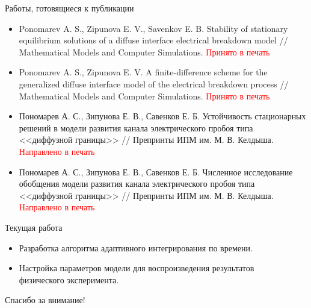\documentclass[aspectratio=169]{beamer}
\begin{document}
\begin{frame}{Работы, готовящиеся к публикации}
\begin{itemize}
	\item Ponomarev A. S., Zipunova E. V., Savenkov E. B. Stability of stationary equilibrium solutions of a diffuse interface electrical breakdown model // Mathematical Models and Computer Simulations. \textcolor{red}{Принято в печать}
	\item Ponomarev A. S., Zipunova E. V. A finite-difference scheme for the generalized diffuse interface model of the electrical breakdown process // Mathematical Models and Computer Simulations. \textcolor{red}{Принято в печать}
	\item Пономарев А. С., Зипунова Е. В., Савенков Е. Б. Устойчивость стационарных решений в модели развития канала электрического пробоя типа <<диффузной границы>> // Препринты ИПМ им. М. В. Келдыша. \textcolor{red}{Направлено в печать}
	\item Пономарев А. С., Зипунова Е. В., Савенков Е. Б. Численное исследование обобщения модели развития канала электрического пробоя типа <<диффузной границы>> // Препринты ИПМ им. М. В. Келдыша. \textcolor{red}{Направлено в печать}
\end{itemize}
\end{frame}


\begin{frame}{Текущая работа}
\begin{itemize}
	\item Разработка алгоритма адаптивного интегрирования по времени.
	\item Настройка параметров модели для воспроизведения результатов \\ физического эксперимента.
\end{itemize}
\end{frame}


\begin{frame}{}
\begin{center}
	\Large
	Спасибо за внимание!
\end{center}
\end{frame}
\end{document}
